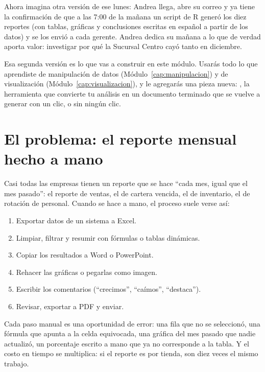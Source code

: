 Ahora imagina otra versión de ese lunes: Andrea llega, abre su correo y ya
tiene la confirmación de que a las 7:00 de la mañana un script de R generó
los diez reportes (con tablas, gráficas y conclusiones escritas en español a
partir de los datos) y se los envió a cada gerente. Andrea dedica su mañana a
lo que de verdad aporta valor: investigar por qué la Sucursal Centro cayó
tanto en diciembre.

Esa segunda versión es lo que vas a construir en este módulo. Usarás todo lo
que aprendiste de manipulación de datos (Módulo~\ref{cap:manipulacion}) y de
visualización (Módulo~\ref{cap:visualizacion}), y le agregarás una pieza
nueva: , la herramienta que convierte tu análisis en un
documento terminado que se vuelve a generar con un clic, o sin ningún clic.

\section{El problema: el reporte mensual hecho a mano}
\label{sec:m8-problema}

Casi todas las empresas tienen un reporte que se hace ``cada mes, igual que
el mes pasado'': el reporte de ventas, el de cartera vencida, el de
inventario, el de rotación de personal. Cuando se hace a mano, el proceso
suele verse así:

\begin{enumerate}
  \item Exportar datos de un sistema a Excel.
  \item Limpiar, filtrar y resumir con fórmulas o tablas dinámicas.
  \item Copiar los resultados a Word o PowerPoint.
  \item Rehacer las gráficas o pegarlas como imagen.
  \item Escribir los comentarios (``crecimos'', ``caímos'', ``destaca'').
  \item Revisar, exportar a PDF y enviar.
\end{enumerate}

Cada paso manual es una oportunidad de error: una fila que no se seleccionó,
una fórmula que apunta a la celda equivocada, una gráfica del mes pasado que
nadie actualizó, un porcentaje escrito a mano que ya no corresponde a la
tabla. Y el costo en tiempo se multiplica: si el reporte es por tienda, son
diez veces el mismo trabajo.

